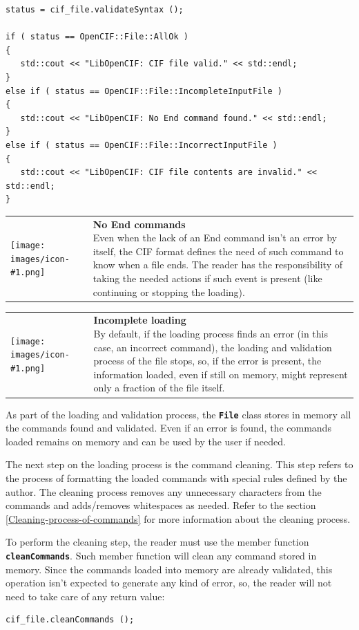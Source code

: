 \documentclass[11pt,twoside,openany,x11names,svgnames]{memoir}
\makeatletter
\newcommand{\IconNote}[3]
{
	\begin{table}[ht]
	\begin{tabular}{ lm{\dimexpr\textwidth-8\tabcolsep-\wd0}@{}}
		\toprule
		\texttt{[image: images/icon-\#1.png]}
		&
		\parbox[t]{155mm}{
		\textbf{#2} \\
		#3
		}
	\end{tabular}
\end{table}
}
\makeatother
\begin{document}
\begin{lstlisting}[frame=single,style=CPPStyle]
status = cif_file.validateSyntax ();
   
if ( status == OpenCIF::File::AllOk )
{
   std::cout << "LibOpenCIF: CIF file valid." << std::endl;
}
else if ( status == OpenCIF::File::IncompleteInputFile )
{
   std::cout << "LibOpenCIF: No End command found." << std::endl;
}
else if ( status == OpenCIF::File::IncorrectInputFile )
{
   std::cout << "LibOpenCIF: CIF file contents are invalid." << std::endl;
}
\end{lstlisting}

\IconNote
	{warning}
	{No End commands}
	{Even when the lack of an End command isn't an error by itself, the CIF format defines the need of such command to know when a file ends. The reader has the responsibility of taking the needed actions if such event is present (like continuing or stopping the loading).}
	
\IconNote
	{warning}
	{Incomplete loading}
	{By default, if the loading process finds an error (in this case, an incorrect command), the loading and validation process of the file stops, so, if the error is present, the information loaded, even if still on memory, might represent only a fraction of the file itself.}
	
As part of the loading and validation process, the \textbf{\texttt{File}} class stores in memory all the commands found and validated. Even if an error is found, the commands loaded remains on memory and can be used by the user if needed.

The next step on the loading process is the command cleaning. This step refers to the process of formatting the loaded commands with special rules defined by the author. The cleaning process removes any unnecessary characters from the commands and adds/removes whitespaces as needed. Refer to the section \ref{Cleaning-process-of-commands} for more information about the cleaning process.

To perform the cleaning step, the reader must use the member function \textbf{\texttt{cleanCommands}}. Such member function will clean any command stored in memory. Since the commands loaded into memory are already validated, this operation isn't expected to generate any kind of error, so, the reader will not need to take care of any return value:

\begin{lstlisting}[frame=single,style=CPPStyle]
cif_file.cleanCommands ();
\end{lstlisting}
\end{document}
